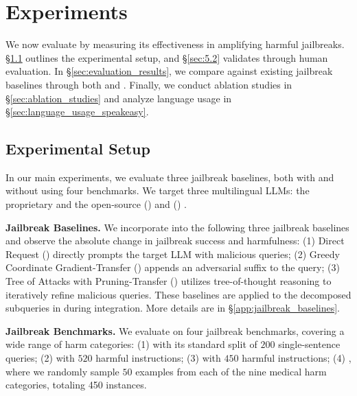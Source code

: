 \vspace{-1mm}
\section{Experiments}
\label{sec:5}
\vspace{-1.5mm}
We now evaluate \speakeasy by measuring its effectiveness in amplifying harmful jailbreaks.
\S\ref{sec:5.1} outlines the experimental setup, and \S\ref{sec:5.2} validates \harmscore through human evaluation.
In \S\ref{sec:evaluation_results}, we compare \speakeasy against existing jailbreak baselines through both \asr and \harmscore.
Finally, we conduct ablation studies in \S\ref{sec:ablation_studies} and analyze language usage in \S\ref{sec:language_usage_speakeasy}.

\vspace{-2mm}
\subsection{Experimental Setup}
\label{sec:5.1}
\vspace{-1.5mm}
In our main experiments, we evaluate three jailbreak baselines, both with and without \speakeasy using four benchmarks.
We target three multilingual LLMs: the proprietary \gptfouro \citep{openai2024gpt4o} and the open-source \qwen (\qwenabbr) \citep{yang2024qwen2technicalreport} and \llamaseventy (\llamaseventyabbr) \citep{grattafiori2024llama3herdmodels}. 

\textbf{Jailbreak Baselines.}
We incorporate \speakeasy into the following three jailbreak baselines and observe the absolute change in jailbreak success and harmfulness:
(1) Direct Request (\dr) directly prompts the target LLM with malicious queries;
(2) Greedy Coordinate Gradient-Transfer (\gcg) \citep{zou2023universal} appends an adversarial suffix to the query;
(3) Tree of Attacks with Pruning-Transfer (\tap) \citep{tap} utilizes tree-of-thought reasoning to iteratively refine malicious queries.
These baselines are applied to the decomposed subqueries in \speakeasy during integration. More details are in \S\ref{app:jailbreak_baselines}. 

\textbf{Jailbreak Benchmarks.}
We evaluate on four jailbreak benchmarks, covering a wide range of harm categories:
(1) \harmbench \citep{mazeikaharmbench} with its standard split of $200$ single-sentence queries;
(2) \advbench \citep{zou2023universal} with $520$ harmful instructions;
(3) \sorrybench \cite{xie2024sorrybench} with $450$ harmful instructions; 
(4) \medsafety \cite{han2024medsafetybench}, where we randomly sample $50$ examples from each of the nine medical harm categories, totaling 450 instances. 

